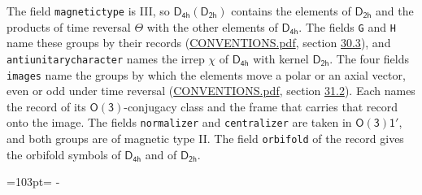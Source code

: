 \documentclass[10pt,a4paper]{article}
\newcommand{\needspace}[1]{\par\penalty-100\begingroup\dimen0=#1\relax\dimen2=\pagegoal
  \advance\dimen2-\pagetotal\ifdim\dimen0>\dimen2\relax\ifdim\dimen2>0pt\vfil\break\fi\fi
  \endgroup}
\numberwithin{equation}{section}
\newcommand{\grp}[1]{\mathsf{#1}}
\begin{document}
The field \texttt{magnetictype} is III, so $\grp{D_{4h}}(\grp{D_{2h}})$ contains the elements of $\grp{D_{2h}}$ and the products of time reversal $\varTheta$ with the other elements of $\grp{D_{4h}}$. The fields \texttt{G} and \texttt{H} name these groups by their records (\href{../../CONVENTIONS.pdf}{CONVENTIONS.pdf}, section \href{../../CONVENTIONS.pdf\#conv.30.3}{30.3}), and \texttt{antiunitarycharacter} names the irrep $\chi$ of $\grp{D_{4h}}$ with kernel $\grp{D_{2h}}$. The four fields \texttt{images} name the groups by which the elements move a polar or an axial vector, even or odd under time reversal (\href{../../CONVENTIONS.pdf}{CONVENTIONS.pdf}, section \href{../../CONVENTIONS.pdf\#conv.31.2}{31.2}). Each names the record of its $\grp{O(3)}$-conjugacy class and the frame that carries that record onto the image. The fields \texttt{normalizer} and \texttt{centralizer} are taken in $\grp{O(3)1'}$, and both groups are of magnetic type II. The field \texttt{orbifold} of the record gives the orbifold symbols of $\grp{D_{4h}}$ and of $\grp{D_{2h}}$.
\needspace{103pt}
\end{document}
